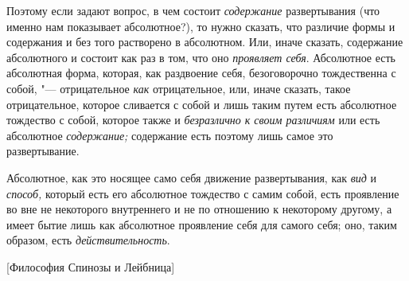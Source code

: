 Поэтому если задают вопрос, в чем состоит
{\em содержание} развертывания (что именно нам
показывает абсолютное?), то нужно сказать, что различие формы и содержания
и без того растворено в абсолютном. Или, иначе сказать, содержание
абсолютного и состоит как раз в том, что оно
{\em проявляет себя}. Абсолютное есть абсолютная форма,
которая, как раздвоение себя, безоговорочно тождественна с собой, "---
отрицательное {\em как} отрицательное, или, иначе
сказать, такое отрицательное, которое сливается с собой и лишь таким путем
есть абсолютное тождество с собой, которое также и
{\em безразлично к своим различиям} или есть абсолютное
{\em содержание;} содержание есть поэтому лишь самое это развертывание.

Абсолютное, как это носящее само себя движение развертывания, как
{\em вид} и {\em способ,} который
есть его абсолютное тождество с самим собой, есть проявление во вне не
некоторого внутреннего и не по отношению к некоторому другому, а имеет
бытие лишь как абсолютное проявление себя для самого себя; оно, таким
образом, есть {\em действительность}.

%
  {[Философия Спинозы и Лейбница]}

